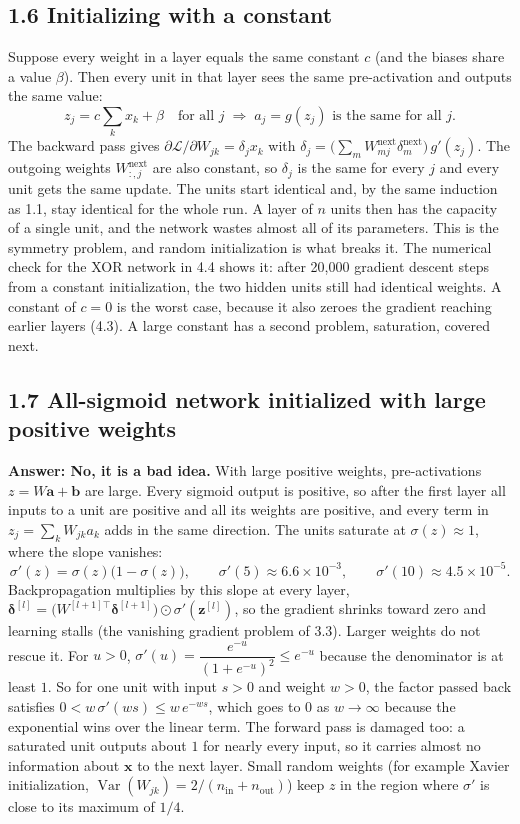 \documentclass[11pt]{article}
\begin{document}
\subsection*{1.6 Initializing with a constant}
Suppose every weight in a layer equals the same constant $c$ (and the biases share a value $\beta$). Then every unit in that layer sees the same pre-activation and outputs the same value:
\[
z_j = c\sum_k x_k + \beta \quad\text{for all } j \;\Longrightarrow\; a_j = g(z_j) \text{ is the same for all } j.
\]
The backward pass gives $\partial \mathcal{L}/\partial W_{jk} = \delta_j x_k$ with $\delta_j = \big(\sum_m W^{\text{next}}_{mj}\delta^{\text{next}}_m\big)\,g'(z_j)$. The outgoing weights $W^{\text{next}}_{:,j}$ are also constant, so $\delta_j$ is the same for every $j$ and every unit gets the same update. The units start identical and, by the same induction as 1.1, stay identical for the whole run. A layer of $n$ units then has the capacity of a single unit, and the network wastes almost all of its parameters. This is the symmetry problem, and random initialization is what breaks it. The numerical check for the XOR network in 4.4 shows it: after 20{,}000 gradient descent steps from a constant initialization, the two hidden units still had identical weights. A constant of $c = 0$ is the worst case, because it also zeroes the gradient reaching earlier layers (4.3). A large constant has a second problem, saturation, covered next.

\subsection*{1.7 All-sigmoid network initialized with large positive weights}
\textbf{Answer: No, it is a bad idea.} With large positive weights, pre-activations $z = W\mathbf{a} + \mathbf{b}$ are large. Every sigmoid output is positive, so after the first layer all inputs to a unit are positive and all its weights are positive, and every term in $z_j = \sum_k W_{jk}a_k$ adds in the same direction. The units saturate at $\sigma(z)\approx 1$, where the slope vanishes:
\[
\sigma'(z) = \sigma(z)\big(1-\sigma(z)\big), \qquad \sigma'(5) \approx 6.6\times10^{-3}, \qquad \sigma'(10) \approx 4.5\times10^{-5}.
\]
Backpropagation multiplies by this slope at every layer, $\boldsymbol\delta^{[l]} = \big(W^{[l+1]\top}\boldsymbol\delta^{[l+1]}\big)\odot\sigma'(\mathbf{z}^{[l]})$, so the gradient shrinks toward zero and learning stalls (the vanishing gradient problem of 3.3). Larger weights do not rescue it. For $u>0$, $\sigma'(u) = \dfrac{e^{-u}}{(1+e^{-u})^2} \le e^{-u}$ because the denominator is at least $1$. So for one unit with input $s > 0$ and weight $w>0$, the factor passed back satisfies $0 < w\,\sigma'(ws) \le w\,e^{-ws}$, which goes to $0$ as $w\to\infty$ because the exponential wins over the linear term. The forward pass is damaged too: a saturated unit outputs about $1$ for nearly every input, so it carries almost no information about $\mathbf{x}$ to the next layer. Small random weights (for example Xavier initialization, $\operatorname{Var}(W_{jk}) = 2/(n_{\text{in}}+n_{\text{out}})$) keep $z$ in the region where $\sigma'$ is close to its maximum of $1/4$.
\end{document}
